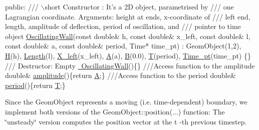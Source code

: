 \begin{DoxyCodeInclude}
\textcolor{keyword}{public}:
\textcolor{comment}{}
\textcolor{comment}{ /// \(\backslash\)short Constructor : It's a 2D object, parametrised by }
\textcolor{comment}{ /// one Lagrangian coordinate. Arguments: height at ends, x-coordinate of }
\textcolor{comment}{ /// left end, length, amplitude of deflection, period of oscillation, and}
\textcolor{comment}{ /// pointer to time object}
\textcolor{comment}{} \hyperlink{classOscillatingWall_a5ededc3d27eef5c4ef7e82ac5cdf6ff9}{OscillatingWall}(\textcolor{keyword}{const} \textcolor{keywordtype}{double}& h, \textcolor{keyword}{const} \textcolor{keywordtype}{double}& x\_left, \textcolor{keyword}{const} \textcolor{keywordtype}{double}& l, 
                 \textcolor{keyword}{const} \textcolor{keywordtype}{double}& a, \textcolor{keyword}{const} \textcolor{keywordtype}{double}& period, Time* time\_pt) : 
  GeomObject(1,2), \hyperlink{classOscillatingWall_aa587e944cac9e501e6d3323731145b95}{H}(h), \hyperlink{classOscillatingWall_ac5e2ad6d5ef2992ba9295118787190e6}{Length}(l), \hyperlink{classOscillatingWall_a71a60ee3294746875a24aeeffb38f7ec}{X\_left}(x\_left), \hyperlink{classOscillatingWall_ac22b6ac70a42850ddbe2e9c4c16f4664}{A}(a), \hyperlink{classOscillatingWall_a9db810649987a2011c7fe14d10b98b9a}{B}(0.0), 
      \hyperlink{classOscillatingWall_af33b31988c823d33a3b147281ec94599}{T}(period), 
  \hyperlink{classOscillatingWall_a9c4bea6ec6e80ba23139cd5a1d4d25d5}{Time\_pt}(time\_pt) 
  \{\}
 \textcolor{comment}{}
\textcolor{comment}{ /// Destructor:  Empty}
\textcolor{comment}{} \hyperlink{classOscillatingWall_adc35b40bdd733a244d6399d91fa20ade}{~OscillatingWall}()\{\}
\textcolor{comment}{}
\textcolor{comment}{///Access function to the amplitude}
\textcolor{comment}{} \textcolor{keywordtype}{double}& \hyperlink{classOscillatingWall_ae923c6a7abefe33efaf47a4b69d1b621}{amplitude}()\{\textcolor{keywordflow}{return} \hyperlink{classOscillatingWall_ac22b6ac70a42850ddbe2e9c4c16f4664}{A};\}
\textcolor{comment}{}
\textcolor{comment}{///Access function to the period}
\textcolor{comment}{} \textcolor{keywordtype}{double}& \hyperlink{classOscillatingWall_ac3e0098c026e23dd8be8ea29f6a9c101}{period}()\{\textcolor{keywordflow}{return} \hyperlink{classOscillatingWall_af33b31988c823d33a3b147281ec94599}{T};\}

\end{DoxyCodeInclude}


Since the {\ttfamily Geom\+Object} represents a moving (i.\+e. time-\/dependent) boundary, we implement both versions of the {\ttfamily Geom\+Object\+::position}(...) function\+: The \char`\"{}unsteady\char`\"{} version computes the position vector at the {\ttfamily t} -\/th previous timestep.


